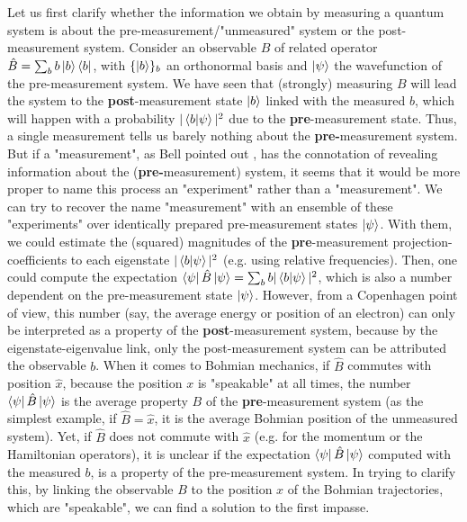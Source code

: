 \documentclass[11pt, a4paper]{article} %
\begin{document}
Let us first clarify whether the information we obtain by measuring a quantum system is about the pre-measurement/"unmeasured" system or the post-measurement system. Consider an observable $B$ of related operator $\hat{B}=\sum_b b\ket{b}\bra{b}$, with $\{\ket{b}\}_b$ an orthonormal basis and $\ket{\psi}$ the wavefunction of the pre-measurement system. We have seen that (strongly) measuring $B$ will lead the system to the {\bf post}-measurement state $\ket{b}$ linked with the measured $b$, which will happen with a probability $|\bra{b}\ket{\psi}|^2$ due to the {\bf pre}-measurement state. Thus, a single measurement tells us barely nothing about the {\bf pre-}measurement system. But if a "measurement", as Bell pointed out \cite{Bell}, has the connotation of revealing information about the ({\bf pre-}measurement) system, it seems that it would be more proper to name this process an "experiment" rather than a "measurement". We can try to recover the name "measurement" with an ensemble of these "experiments" over identically prepared pre-measurement states $\ket{\psi}$. With them, we could estimate the (squared) magnitudes of the {\bf pre}-measurement projection-coefficients to each eigenstate $|\bra{b}\ket{\psi}|^2$ (e.g. using relative frequencies). Then, one could compute the expectation $\bra{\psi} \hat B \ket{\psi}=\sum_b b |\bra{b}\ket{\psi}|^2$, which is also a number dependent on the pre-measurement state $\ket{\psi}$. However, from a Copenhagen point of view, this number (say, the average energy or position of an electron) can only be interpreted as a property of the {\bf post}-measurement system, because by the eigenstate-eigenvalue link, only the post-measurement system can be attributed the observable $b$. When it comes to Bohmian mechanics, if $\hat{B}$ commutes with position $\hat{x}$, because the position $x$ is "speakable" at all times, the number $\bra{\psi} \hat B \ket{\psi}$ is the average property $B$ of the {\bf pre}-measurement system (as the simplest example, if $\hat{B}=\hat{x}$, it is the average Bohmian position of the unmeasured system). Yet, if $\hat{B}$ does not commute with $\hat{x}$ (e.g. for the momentum or the Hamiltonian operators), it is unclear if the expectation $\bra{\psi} \hat B \ket{\psi}$ computed with the measured $b$, is a property of the pre-measurement system. In trying to clarify this, by linking the observable $B$ to the position $x$ of the Bohmian trajectories, which are "speakable", we can find a solution to the first impasse.
\end{document}
